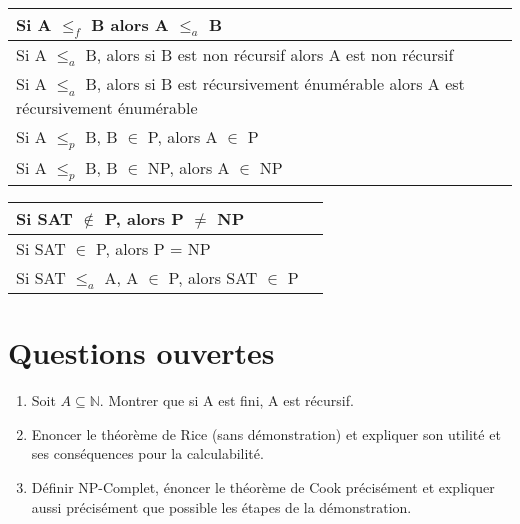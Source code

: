 \documentclass[12pt, a4paper]{article}
\begin{document}
\begin{tabular}{p{13cm}|l}
Si A $\leq_f$ B alors A $\leq_a$ B & \\ \hline
Si A $\leq_a$ B, alors si B est non récursif alors A est non récursif & \\ \hline
Si A $\leq_a$ B, alors si B est récursivement énumérable alors A est récursivement énumérable & \\ \hline
Si A $\leq_p$ B, B $\in$ P, alors A $\in$ P & \\ \hline
Si A $\leq_p$  B, B $\in$ NP, alors A $\in$ NP & \\ \hline
\end{tabular}
\bigskip

\begin{tabular}{p{13cm}|l}
Si SAT $\notin$ P, alors P $\not=$ NP & \\ \hline
Si SAT $\in$ P, alors P = NP & \\ \hline
Si SAT $\leq_a$ A, A $\in$ P, alors SAT $\in$ P & \\ \hline
\end{tabular}

\section{Questions ouvertes}

\begin{enumerate}
	\item Soit $A \subseteq \mathbb{N}$. Montrer que si A est fini, A est récursif.
	\item Enoncer le théorème de Rice (sans démonstration) et expliquer son utilité et ses conséquences pour la calculabilité.
	\item Définir NP-Complet, énoncer le théorème de Cook précisément et expliquer aussi précisément que possible les étapes de la démonstration.
\end{enumerate}
\end{document}
